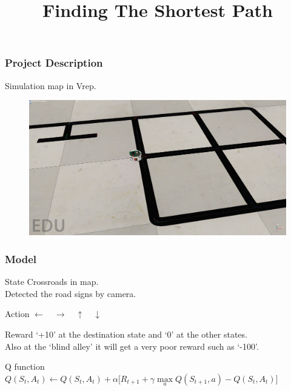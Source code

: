 \documentclass{beamer}
\title[Applied Reinforcement Learning]{Finding The Shortest Path} %
\author{ } %
\institute[Technical University of Munich] %
{
Tianming Qiu, Lingfeng Zhang, Wenhan Hao\\ %
\medskip
}
\begin{document}
\begin{frame}
\titlepage %
\end{frame}

\begin{frame}
\frametitle{Project Description}
Simulation map in Vrep.
\begin{figure}
\includegraphics[width=0.88\linewidth]{simulatemap}
\end{figure}
\end{frame}

\begin{frame}
\frametitle{Model}
\begin{block}{State}
Crossroads in map.
\\
Detected the road signs by camera.
\end{block}

\begin{block}{Action}
$\leftarrow \quad \rightarrow \quad \uparrow \quad \downarrow$
\end{block}

\begin{block}{Reward}
‘+10’ at the destination state and ‘0’ at the other states.\\ 
Also at the ‘blind alley’ it will get a very poor reward such as ‘-100’.
\end{block}
\begin{block}{Q function}
${Q(S_t,A_t)\xleftarrow{}  Q(S_t,A_t)+ }\alpha {[ R_{t+1} + }\gamma {\max \limits_{a}Q(S_{t+1},a)-Q(S_t,A_t)]}
$
\end{block}
\end{frame}
\end{document}

